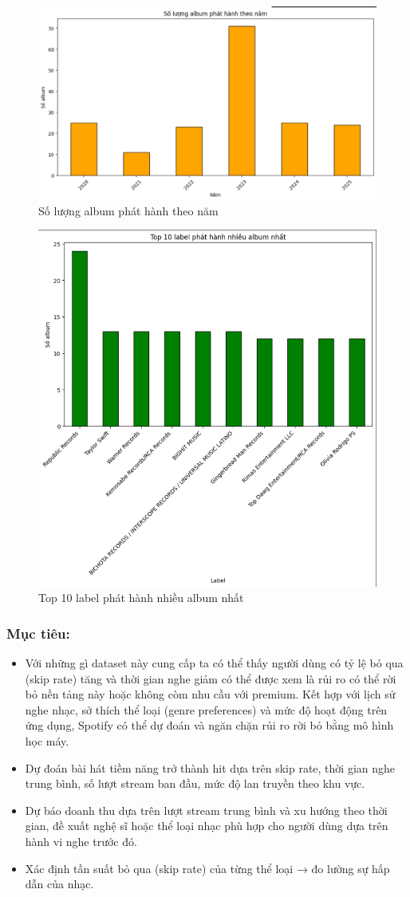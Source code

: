 \begin{figure}[H]
    \centering
    \includegraphics[width=0.7\linewidth]{../graphics/data2/9.png}
    \caption{Số lượng album phát hành theo năm}
    \label{fig:placeholder}
\end{figure}

\begin{figure}[H]
    \centering
    \includegraphics[width=0.7\linewidth]{../graphics/data2/10.png}
    \caption{Top 10 label phát hành nhiều album nhất}
    \label{fig:placeholder}
\end{figure}

\subsubsection{Mục tiêu:}
\begin{itemize}
    \item Với những gì dataset này cung cấp ta có thể thấy người dùng có tỷ lệ bỏ qua (skip rate) tăng và thời gian nghe giảm có thể được xem là rủi ro có thể rời bỏ nền tảng này hoặc không còm nhu cầu với premium. Kết hợp với lịch sử nghe nhạc, sở thích thể loại (genre preferences) và mức độ hoạt động trên ứng dụng, Spotify có thể dự đoán và ngăn chặn rủi ro rời bỏ bằng mô hình học máy.
    \item Dự đoán bài hát tiềm năng trở thành hit dựa trên skip rate,
thời gian nghe trung bình, số lượt stream ban đầu, mức độ lan truyền theo khu vực.
    \item Dự báo doanh thu dựa trên lượt stream trung bình và xu hướng theo thời gian, đề xuất nghệ sĩ hoặc thể loại nhạc phù hợp cho người dùng dựa trên hành vi nghe trước đó. 
    \item Xác định tần suất bỏ qua (skip rate) của từng thể loại → đo lường sự hấp dẫn của nhạc.

\end{itemize}
